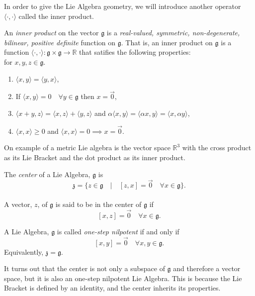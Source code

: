 \documentclass[11 pt]{article}
\renewcommand{\a}{\alpha}
\newcommand{\fg}{\mathfrak{g}}
\newcommand{\fz}{\mathfrak{z}}
\newcommand{\RR}{\mathbb{R}}
\begin{document}
    In order to give the Lie Algebra geometry, we will introduce another
    operator $\langle\cdot,\cdot\rangle$ called the inner product.
\begin{definition}
    An \emph{inner product} on the vector $\fg$ is a
    \emph{real-valued, symmetric, non-degenerate, bilinear, positive definite}
    function on $\fg$.  That is, an inner product on $\fg$ is a function
    $\langle\cdot,\cdot\rangle:\fg\times\fg\to\RR$ that satifies the following
    properties:
    \\for $x,y,z \in \fg$.
    \begin{enumerate}
        \item $\langle x,y \rangle = \langle y,x \rangle$,
        \item If $\langle x,y \rangle = 0 \quad \forall y \in \fg$
            then $x = \Vec{0}$,
        \item
            $\langle x+y,z \rangle = \langle x,z \rangle + \langle y,z \rangle$
            and $\a \langle x,y \rangle = \langle \a x,y \rangle
            = \langle x,\a y \rangle$,
        \item $\langle x,x \rangle \geq 0$
            and $\langle x,x\rangle = 0 \implies x=\Vec{0}$.
    \end{enumerate}
\end{definition}
    On example of a metric Lie algebra is the vector space $\RR^3$ with the
    cross product as its Lie Bracket and the dot product as its inner product.

\begin{definition}
    The \emph{center} of a Lie Algebra, $\fg$ is
    \\\[\fz=\{z \in \fg \quad | \quad [z,x]
    = \Vec{0} \quad \forall x \in \fg\}.\]
    \\A vector, $z$, of $\fg$ is said to be in the center of $\fg$ if
    \\\[[x,z] = \Vec{0} \quad \forall x \in \fg.\]
\end{definition}

\begin{definition}
    A Lie Algebra, $\fg$ is called \emph{one-step nilpotent} if and only if
    \\\[[x,y] = \Vec{0} \quad \forall x,y \in \fg.\]
    Equivalently, $\fz = \fg.$
\end{definition}

It turns out that the center is not only a subspace of $\fg$ and therefore a
vector space, but it is also an one-step nilpotent Lie Algebra.  This is
because the Lie Bracket is defined by an identity, and the center inherits its
properties.
\end{document}
